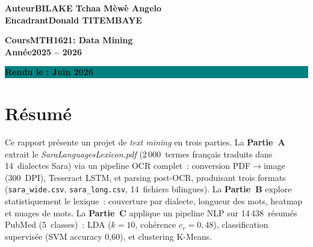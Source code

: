 \documentclass[11pt, a4paper, oneside]{article}
\begin{document}
\begin{titlepage}
  \vspace{1.5cm}
  \begin{center}
    \begin{minipage}{0.42\textwidth}
      \begin{flushleft}
        \normalsize\bfseries\color{teal}Auteur\hspace{0.6cm}\color{black}BILAKE Tchaa Mèwè Angelo\\[0.5cm]
        \normalsize\bfseries\color{teal}Encadrant\hspace{0.3cm}\color{black}Donald TITEMBAYE
      \end{flushleft}
    \end{minipage}
    \hfill
    \begin{minipage}{0.42\textwidth}
      \begin{flushright}
        \normalsize\bfseries\color{teal}Cours\hspace{1cm}\color{black}MTH1621: Data Mining\\[0.5cm]
        \normalsize\bfseries\color{teal}Année\hspace{0.6cm}\color{black}2025 -- 2026
      \end{flushright}
    \end{minipage}
  \end{center}

  \vfill
  \begin{center}
    \colorbox{teal}{%
      \begin{minipage}{\textwidth}
        \centering
        \vspace{0.5cm}
        {\normalsize\bfseries\color{gold} Rendu le : Juin 2026}
        \vspace{0.5cm}
      \end{minipage}%
    }%
  \end{center}
\end{titlepage}

\section*{Résumé}

Ce rapport présente un projet de \emph{text mining} en trois parties. La \textbf{Partie~A} extrait le \emph{SaraLanguagesLexicon.pdf} (2\,000~termes français traduits dans 14~dialectes Sara) via un pipeline OCR complet~: conversion PDF$\to$image (300~DPI), Tesseract LSTM, et parsing post-OCR, produisant trois formats (\texttt{sara\_wide.csv}, \texttt{sara\_long.csv}, 14~fichiers bilingues). La \textbf{Partie~B} explore statistiquement le lexique~: couverture par dialecte, longueur des mots, heatmap et nuages de mots. La \textbf{Partie~C} applique un pipeline NLP sur 14\,438~résumés PubMed (5~classes)~: LDA ($k=10$, cohérence $c_v=0,48$), classification supervisée (SVM accuracy 0,60), et clustering K-Means.
\end{document}
